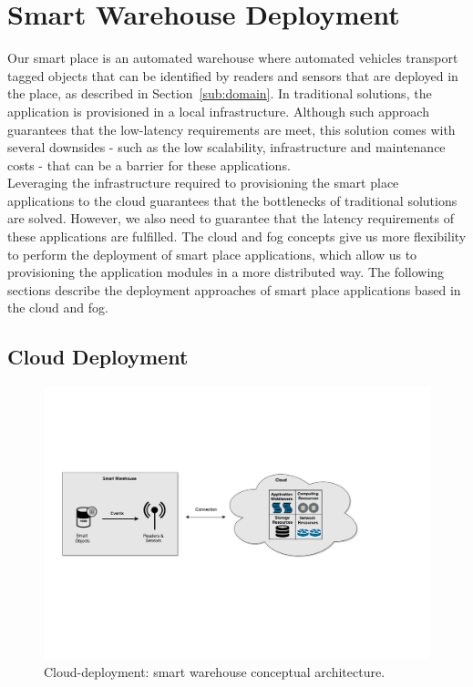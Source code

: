 \section{Smart Warehouse Deployment}
\label{sec:sol_smart_warehouse_deployment}
Our smart place is an automated warehouse where automated vehicles transport tagged objects that can
be identified by readers and sensors that are deployed in the place, as described in Section~\ref{sub:domain}.
In traditional solutions, the application is provisioned in a local infrastructure. Although such
approach guarantees that the low-latency requirements are meet, this solution comes with several
downsides - such as the low scalability, infrastructure and maintenance costs - that can be a barrier
for these applications.\\

Leveraging the infrastructure required to provisioning the smart place applications to the cloud
guarantees that the bottlenecks of traditional solutions are solved. However, we also need to
guarantee that the latency requirements of these applications are fulfilled. The cloud and fog concepts
give us more flexibility to perform the deployment of smart place applications, which allow us to
provisioning the application modules in a more distributed way. The following sections describe
the deployment approaches of smart place applications based in the cloud and fog.

\subsection{Cloud Deployment}
\label{sub:sol_cloud}

\begin{figure}[ht!]
\centering
\includegraphics[width=\textwidth]{./images/solution_cloud_architecture}
\caption[Cloud-deployment: conceptual architecture.]{Cloud-deployment: smart warehouse conceptual architecture.}
\label{fig:solution_cloud_architecture}
\end{figure}

